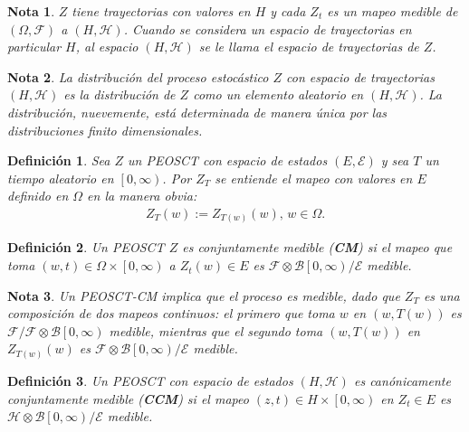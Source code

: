 \documentclass{article}
\newtheorem{Def}{Definición}[section]
\newtheorem{Note}{Nota}%
\numberwithin{equation}{section}
\begin{document}
\begin{Note}
$Z$ tiene trayectorias con valores en $H$ y cada $Z_{t}$ es un mapeo medible de $\left(\Omega,\mathcal{F}\right)$ a $\left(H,\mathcal{H}\right)$. Cuando se considera un espacio de trayectorias en particular $H$, al espacio $\left(H,\mathcal{H}\right)$ se le llama el espacio de trayectorias de $Z$.
\end{Note}

\begin{Note}
La distribuci\'on del proceso estoc\'astico $Z$ con espacio de trayectorias $\left(H,\mathcal{H}\right)$ es la distribuci\'on de $Z$ como  un elemento aleatorio en $\left(H,\mathcal{H}\right)$. La distribuci\'on, nuevemente, est\'a determinada de manera \'unica por las distribuciones finito dimensionales.
\end{Note}


\begin{Def}
Sea $Z$ un PEOSCT  con espacio de estados $\left(E,\mathcal{E}\right)$ y sea $T$ un tiempo aleatorio en $\left[0,\infty\right)$. Por $Z_{T}$ se entiende el mapeo con valores en $E$ definido en $\Omega$ en la manera obvia:
\begin{eqnarray}
Z_{T}\left(w\right):=Z_{T\left(w\right)}\left(w\right)\textrm{, }w\in\Omega.
\end{eqnarray}
\end{Def}

\begin{Def}
Un PEOSCT $Z$ es conjuntamente medible (\textbf{CM}) si el mapeo que toma $\left(w,t\right)\in\Omega\times\left[0,\infty\right)$ a $Z_{t}\left(w\right)\in E$ es $\mathcal{F}\otimes\mathcal{B}\left[0,\infty\right)/\mathcal{E}$ medible.
\end{Def}

\begin{Note}
Un PEOSCT-CM implica que el proceso es medible, dado que $Z_{T}$ es una composici\'on  de dos mapeos continuos: el primero que toma $w$ en $\left(w,T\left(w\right)\right)$ es $\mathcal{F}/\mathcal{F}\otimes\mathcal{B}\left[0,\infty\right)$ medible, mientras que el segundo toma $\left(w,T\left(w\right)\right)$ en $Z_{T\left(w\right)}\left(w\right)$ es $\mathcal{F}\otimes\mathcal{B}\left[0,\infty\right)/\mathcal{E}$ medible.
\end{Note}


\begin{Def}
Un PEOSCT con espacio de estados $\left(H,\mathcal{H}\right)$ es can\'onicamente conjuntamente medible (\textbf{CCM}) si el mapeo $\left(z,t\right)\in H\times\left[0,\infty\right)$ en $Z_{t}\in E$ es $\mathcal{H}\otimes\mathcal{B}\left[0,\infty\right)/\mathcal{E}$ medible.
\end{Def}
\end{document}
